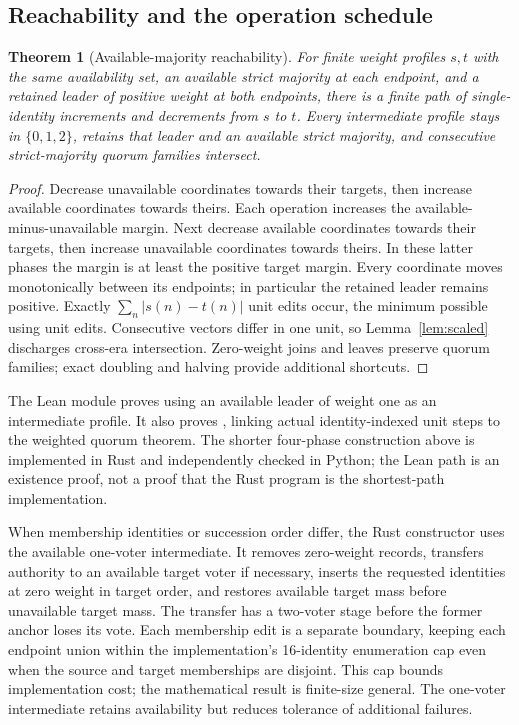 \documentclass[10pt,journal,letterpaper]{IEEEtran}
\newtheorem{theorem}{Theorem}
\begin{document}
\subsection{Reachability and the operation schedule}
\begin{theorem}[Available-majority reachability]\label{thm:reachability}
For finite weight profiles $s,t$ with the same availability set, an available strict majority at each endpoint, and a retained leader of positive weight at both endpoints, there is a finite path of single-identity increments and decrements from $s$ to $t$. Every intermediate profile stays in $\{0,1,2\}$, retains that leader and an available strict majority, and consecutive strict-majority quorum families intersect.
\end{theorem}
\begin{proof}
Decrease unavailable coordinates towards their targets, then increase available coordinates towards theirs. Each operation increases the available-minus-unavailable margin. Next decrease available coordinates towards their targets, then increase unavailable coordinates towards theirs. In these latter phases the margin is at least the positive target margin. Every coordinate moves monotonically between its endpoints; in particular the retained leader remains positive. Exactly $\sum_n|s(n)-t(n)|$ unit edits occur, the minimum possible using unit edits. Consecutive vectors differ in one unit, so Lemma~\ref{lem:scaled} discharges cross-era intersection. Zero-weight joins and leaves preserve quorum families; exact doubling and halving provide additional shortcuts.
\end{proof}
The Lean module  proves  using an available leader of weight one as an intermediate profile. It also proves , linking actual identity-indexed unit steps to the weighted quorum theorem. The shorter four-phase construction above is implemented in Rust and independently checked in Python; the Lean path is an existence proof, not a proof that the Rust program is the shortest-path implementation.

When membership identities or succession order differ, the Rust constructor uses the available one-voter intermediate. It removes zero-weight records, transfers authority to an available target voter if necessary, inserts the requested identities at zero weight in target order, and restores available target mass before unavailable target mass. The transfer has a two-voter stage before the former anchor loses its vote. Each membership edit is a separate boundary, keeping each endpoint union within the implementation's 16-identity enumeration cap even when the source and target memberships are disjoint. This cap bounds implementation cost; the mathematical result is finite-size general. The one-voter intermediate retains availability but reduces tolerance of additional failures.
\end{document}
